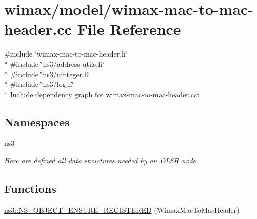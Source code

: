 \hypertarget{wimax-mac-to-mac-header_8cc}{}\section{wimax/model/wimax-\/mac-\/to-\/mac-\/header.cc File Reference}
\label{wimax-mac-to-mac-header_8cc}
{\ttfamily \#include \char`\"{}wimax-\/mac-\/to-\/mac-\/header.\+h\char`\"{}}\\*
{\ttfamily \#include \char`\"{}ns3/address-\/utils.\+h\char`\"{}}\\*
{\ttfamily \#include \char`\"{}ns3/uinteger.\+h\char`\"{}}\\*
{\ttfamily \#include \char`\"{}ns3/log.\+h\char`\"{}}\\*
Include dependency graph for wimax-\/mac-\/to-\/mac-\/header.cc\+:
\subsection*{Namespaces}
\begin{DoxyCompactItemize}
\item 
 \hyperlink{namespacens3}{ns3}
\begin{DoxyCompactList}\small\item\em Here are defined all data structures needed by an O\+L\+SR node. \end{DoxyCompactList}\end{DoxyCompactItemize}
\subsection*{Functions}
\begin{DoxyCompactItemize}
\item 
\hyperlink{namespacens3_adc55493fcbb00f9dc902a507ff68c7c6}{ns3\+::\+N\+S\+\_\+\+O\+B\+J\+E\+C\+T\+\_\+\+E\+N\+S\+U\+R\+E\+\_\+\+R\+E\+G\+I\+S\+T\+E\+R\+ED} (Wimax\+Mac\+To\+Mac\+Header)
\end{DoxyCompactItemize}
